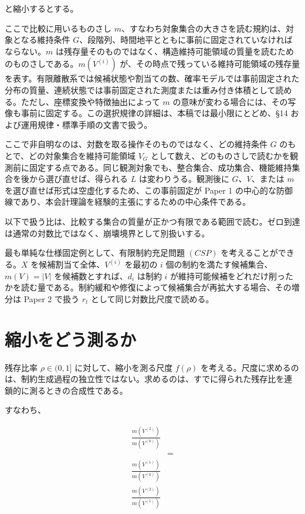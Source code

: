 \documentclass[12pt,a4paper]{article}
\begin{document}
と縮小するとする。

ここで比較に用いるものさし \(m\)、すなわち対象集合の大きさを読む規約は、対象となる維持条件 \(G\)、段階列、時間地平とともに事前に固定されていなければならない。\(m\) は残存量そのものではなく、構造維持可能領域の質量を読むためのものさしである。\(m(V^{(i)})\) が、その時点で残っている維持可能領域の残存量を表す。有限離散系では候補状態や割当ての数、確率モデルでは事前固定された分布の質量、連続状態では事前固定された測度または重み付き体積として読める。ただし、座標変換や特徴抽出によって \(m\) の意味が変わる場合には、その写像も事前に固定する。この選択規律の詳細は、本稿では最小限にとどめ、§14 および運用規律・標準手順の文書で扱う。

ここで非自明なのは、対数を取る操作そのものではなく、どの維持条件 \(G\) のもとで、どの対象集合を維持可能領域 \(V_{G}\) として数え、どのものさしで読むかを観測前に固定する点である。同じ観測対象でも、整合集合、成功集合、機能維持集合を後から選び直せば、得られる \(L\) は変わりうる。観測後に \(G\)、\(V\)、または \(m\) を選び直せば形式は空虚化するため、この事前固定が Paper 1 の中心的な防御線であり、本会計理論を経験的主張にするための中心条件である。

以下で扱う比は、比較する集合の質量が正かつ有限である範囲で読む。ゼロ到達は通常の対数比ではなく、崩壊境界として別扱いする。

最も単純な仕様固定例として、有限制約充足問題 \((CSP)\) を考えることができる。\(X\) を候補割当て全体、\(V^{(i)}\) を最初の \(i\) 個の制約を満たす候補集合、\(m(V)=|V|\) を候補数とすれば、\(d_{i}\) は制約 \(i\) が維持可能候補をどれだけ削ったかを読む量である。制約緩和や修復によって候補集合が再拡大する場合、その増分は Paper 2 で扱う \(r_{t}\) として同じ対数比尺度で読める。

\section{縮小をどう測るか}\label{ux7e2eux5c0fux3092ux3069ux3046ux6e2cux308bux304b}

残存比率 \(\rho\in(0,1]\) に対して、縮小を測る尺度 \(f(\rho)\) を考える。尺度に求めるのは、制約生成過程の独立性ではない。求めるのは、すでに得られた残存比を連鎖的に測るときの合成性である。

すなわち、

\[
\begin{aligned}
\frac{m(V^{(2)})}{m(V^{(0)})} \\
&= \\
\frac{m(V^{(1)})}{m(V^{(0)})} \\
\frac{m(V^{(2)})}{m(V^{(1)})}
\end{aligned}
\]
\end{document}
